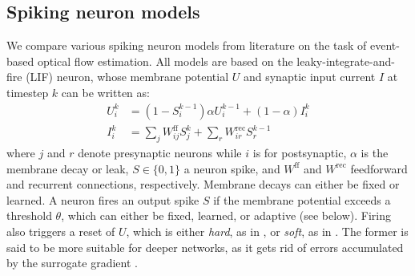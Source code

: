 \subsection*{Spiking neuron models}\label{sec:neurips_neurons}

We compare various spiking neuron models from literature on the task of event-based optical flow estimation. All models are based on the leaky-integrate-and-fire (LIF) neuron, whose membrane potential $U$ and synaptic input current $I$ at timestep $k$ can be written as:
\begin{align}
	U_i^{k} &= (1 - S_i^{k-1})\alpha U_i^{k-1} + (1 - \alpha) I_i^{k}\label{eq:neurips_lif} \\
	I_i^{k} &= \sum_j W_{ij}^{\text{ff}} S_j^{k} + \sum_r W_{ir}^{\text{rec}} S_r^{k-1}\label{eq:neurips_lif2}
\end{align}
where $j$ and $r$ denote presynaptic neurons while $i$ is for postsynaptic, $\alpha$ is the membrane decay or leak, $S \in \{0, 1\}$ a neuron spike, and $W^{\text{ff}}$ and $W^{\text{rec}}$ feedforward and recurrent connections, respectively. Membrane decays can either be fixed or learned. A neuron fires an output spike $S$ if the membrane potential exceeds a threshold $\theta$, which can either be fixed, learned, or adaptive (see below). Firing also triggers a reset of $U$, which is either \emph{hard}, as in , or \emph{soft}, as in \cite{bellec2018long}. The former is said to be more suitable for deeper networks, as it gets rid of errors accumulated by the surrogate gradient \cite{ledinauskas2020training}.%

